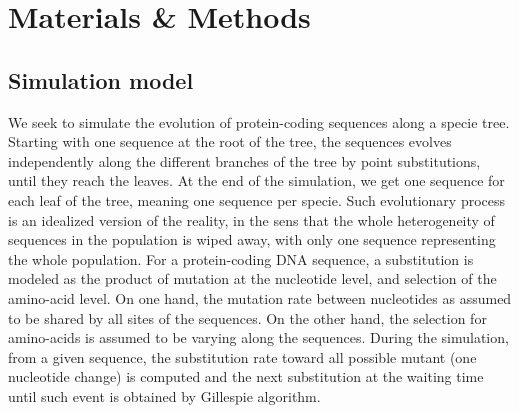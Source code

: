 \section{Materials \& Methods}

\subsection{Simulation model}
\label{sec-mut-bias:simu}
We seek to simulate the evolution of protein-coding sequences along a specie tree.
Starting with one sequence at the root of the tree, the sequences evolves independently along the different branches of the tree by point \glspl{substitution}, until they reach the leaves.
At the end of the simulation, we get one sequence for each leaf of the tree, meaning one sequence per specie.
Such evolutionary process is an idealized version of the reality, in the sens that the whole heterogeneity of sequences in the population is wiped away, with only one sequence representing the whole population.
For a protein-coding \acrshort{DNA} sequence, a \gls{substitution} is modeled as the product of mutation at the nucleotide level, and selection of the amino-acid level.
On one hand, the mutation rate between nucleotides as assumed to be shared by all sites of the sequences.
On the other hand, the selection for amino-acids is assumed to be varying along the sequences.
During the simulation, from a given sequence, the \gls{substitution} rate toward all possible mutant (one nucleotide change) is computed and the next \gls{substitution} at the waiting time until such event is obtained by Gillespie algorithm.

